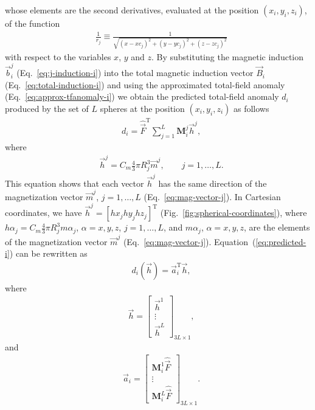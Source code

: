 \documentclass[journal abbreviation, npg]{copernicus}
\begin{document}
whose elements are the second derivatives, evaluated at the position
$(x_{i}, y_{i}, z_{i})$, of the function
\begin{align}
 &
\frac{1}{r_{j}} \equiv
\frac{1}{\sqrt{(x - xc_{j})^{2} +
                        (y - yc_{j})^{2} +
                        (z - zc_{j})^{2}}}
\label{eq:1/rj}
\end{align}
with respect to the variables $x$, $y$ and $z$. By substituting the magnetic
induction $\vec{b}^{j}_{i}$ (Eq.~\ref{eq:j-induction-i}) into the total
magnetic induction vector $\vec{B}_i$ (Eq.~\ref{eq:total-induction-i}) and
using the approximated total-field anomaly (Eq.~\ref{eq:approx-tfanomaly-i})
we obtain the predicted total-field anomaly $d_{i}$ produced by the set of
$L$ spheres at the position $(x_{i}, y_{i}, z_{i})$ as follows
\begin{align}
 &
d_{i} = \hat{\vec{F}}^{\mathrm{T}} \sum_{j = 1}^{L} \mathbf{M}_{i}^{j}  \vec{h}^{j} ,
\label{eq:predicted-i}
\end{align}
where
\begin{align}
 &
\vec{h}^{j} = C_{m}  \frac{4}{3} \pi R_{j}^{3}  \vec{m}^{j} ,
\qquad j = 1, \ldots, L .
\label{eq:hj}
\end{align}
This equation shows that each vector $\vec{h}^{j}$ has the same direction of
the magnetization vector $\vec{m}^{j}$, $j = 1, \ldots, L$
(Eq.~\ref{eq:mag-vector-j}). In Cartesian coordinates, we have $\vec{h}^{j} =
\left[hx_{j} hy_{j} hz_{j}\right]^{\mathrm{T}}$
(Fig.~\ref{fig:spherical-coordinates}), where $h\alpha_{j} = C_{m}
\frac{4}{3} \pi R_{j}^{3} m\alpha_{j}$, $\alpha = x, y, z$, $j = 1, \ldots,
L$, and $m\alpha_{j}$, $\alpha = x, y, z$, are the elements of the
magnetization vector $\vec{m}^{j}$ (Eq.~\ref{eq:mag-vector-j}).
Equation~(\ref{eq:predicted-i}) can be rewritten as
\begin{align}
 &
d_{i}(\vec{h}) = \vec{a}_{i}^{\mathrm{T}} \vec{h} ,
\label{eq:aiTh}
\end{align}
where
\begin{align}
 &
\vec{h} =
\left[
\begin{array}{c}
\vec{h}^{1} \\
\vdots \\
\vec{h}^{L}
\end{array}
\right]_{3L \times 1} ,
\label{eq:h}
\end{align}
and
\begin{align}
 &
\vec{a}_{i} =
\left[
\begin{array}{c}
\mathbf{M}_{i}^{1}  \hat{\vec{F}} \\
\vdots \\
\mathbf{M}_{i}^{L}  \hat{\vec{F}}
\end{array}
\right]_{3L \times 1} .
\label{eq:ai}
\end{align}
\end{document}
